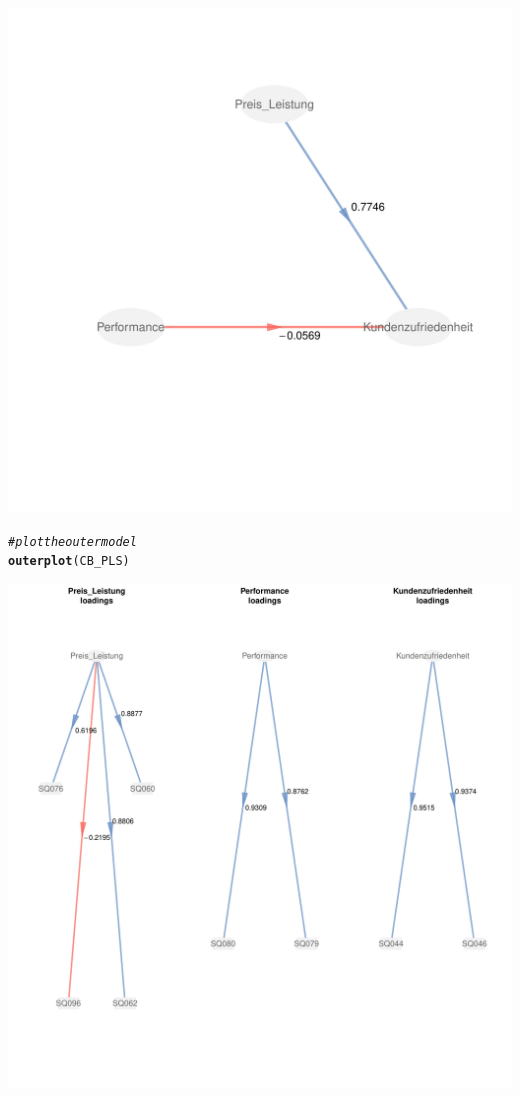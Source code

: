 \documentclass{article}\usepackage[]{graphicx}\usepackage[]{color}
\makeatletter
\def\maxwidth{ %
  \ifdim\Gin@nat@width>\linewidth
    \linewidth
  \else
    \Gin@nat@width
  \fi
}
\newcommand{\hlcom}[1]{\textcolor[rgb]{0.678,0.584,0.686}{\textit{#1}}}%
\newcommand{\hlstd}[1]{\textcolor[rgb]{0.345,0.345,0.345}{#1}}%
\newcommand{\hlkwd}[1]{\textcolor[rgb]{0.737,0.353,0.396}{\textbf{#1}}}%
\newenvironment{kframe}{%
 \def\at@end@of@kframe{}%
 \ifinner\ifhmode%
  \def\at@end@of@kframe{\end{minipage}}%
  \begin{minipage}{\columnwidth}%
 \fi\fi%
 \def\FrameCommand##1{\hskip\@totalleftmargin \hskip-\fboxsep
 \colorbox{shadecolor}{##1}\hskip-\fboxsep
     \hskip-\linewidth \hskip-\@totalleftmargin \hskip\columnwidth}%
 \MakeFramed {\advance\hsize-\width
   \@totalleftmargin\z@ \linewidth\hsize
   \@setminipage}}%
 {\par\unskip\endMakeFramed%
 \at@end@of@kframe}
\newenvironment{knitrout}{}{} %
\makeatother
\begin{document}
\begin{knitrout}
\includegraphics[width=\maxwidth]{figure/zoo1} 
\begin{kframe}\begin{alltt}
\hlcom{#plot the outer model}
\hlkwd{outerplot}\hlstd{(CB_PLS)}
\end{alltt}
\end{kframe}
\includegraphics[width=\maxwidth]{figure/zoo2} 

\end{knitrout}
\end{document}
